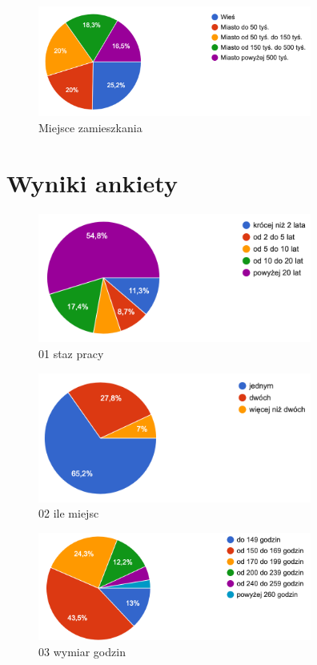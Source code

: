 \begin{figure}
\includegraphics[width=9cm]{char_gr_bad/zamieszka00}
\caption{Miejsce zamieszkania}
\end{figure}


\newpage


\section{Wyniki ankiety}

\begin{figure}
    \includegraphics[width=9cm]{wyniki/01_staz_pracy}
    \caption{ 01 staz pracy }
\end{figure}

\begin{figure}
    \includegraphics[width=9cm]{wyniki/02_ile_miejsc}
    \caption{ 02 ile miejsc }
\end{figure}

\begin{figure}
    \includegraphics[width=9cm]{wyniki/03_wymiar_godzin}
    \caption{ 03 wymiar godzin }
\end{figure}

